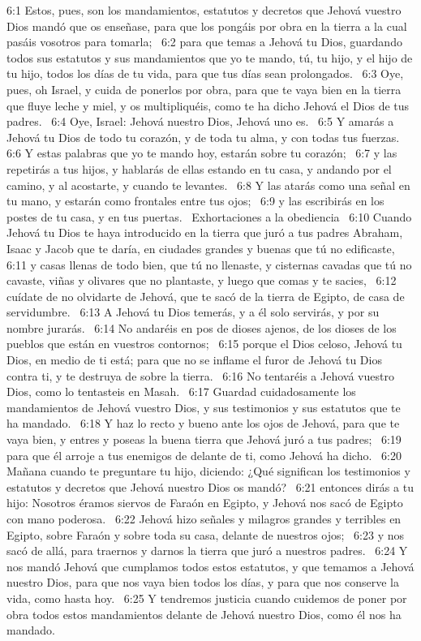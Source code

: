 6:1 Estos, pues, son los mandamientos, estatutos y decretos que Jehová vuestro Dios mandó que os enseñase, para que los pongáis por obra en la tierra a la cual pasáis vosotros para tomarla;  
6:2 para que temas a Jehová tu Dios, guardando todos sus estatutos y sus mandamientos que yo te mando, tú, tu hijo, y el hijo de tu hijo, todos los días de tu vida, para que tus días sean prolongados.  
6:3 Oye, pues, oh Israel, y cuida de ponerlos por obra, para que te vaya bien en la tierra que fluye leche y miel, y os multipliquéis, como te ha dicho Jehová el Dios de tus padres.  
6:4 Oye, Israel: Jehová nuestro Dios, Jehová uno es.  
6:5 Y amarás a Jehová tu Dios de todo tu corazón, y de toda tu alma, y con todas tus fuerzas.  
6:6 Y estas palabras que yo te mando hoy, estarán sobre tu corazón;  
6:7 y las repetirás a tus hijos, y hablarás de ellas estando en tu casa, y andando por el camino, y al acostarte, y cuando te levantes.  
6:8 Y las atarás como una señal en tu mano, y estarán como frontales entre tus ojos;  
6:9 y las escribirás en los postes de tu casa, y en tus puertas.  
Exhortaciones a la obediencia  
6:10 Cuando Jehová tu Dios te haya introducido en la tierra que juró a tus padres Abraham, Isaac y Jacob que te daría, en ciudades grandes y buenas que tú no edificaste,  
6:11 y casas llenas de todo bien, que tú no llenaste, y cisternas cavadas que tú no cavaste, viñas y olivares que no plantaste, y luego que comas y te sacies,  
6:12 cuídate de no olvidarte de Jehová, que te sacó de la tierra de Egipto, de casa de servidumbre.  
6:13 A Jehová tu Dios temerás, y a él solo servirás, y por su nombre jurarás.  
6:14 No andaréis en pos de dioses ajenos, de los dioses de los pueblos que están en vuestros contornos;  
6:15 porque el Dios celoso, Jehová tu Dios, en medio de ti está; para que no se inflame el furor de Jehová tu Dios contra ti, y te destruya de sobre la tierra.  
6:16 No tentaréis a Jehová vuestro Dios, como lo tentasteis en Masah.  
6:17 Guardad cuidadosamente los mandamientos de Jehová vuestro Dios, y sus testimonios y sus estatutos que te ha mandado.  
6:18 Y haz lo recto y bueno ante los ojos de Jehová, para que te vaya bien, y entres y poseas la buena tierra que Jehová juró a tus padres;  
6:19 para que él arroje a tus enemigos de delante de ti, como Jehová ha dicho.  
6:20 Mañana cuando te preguntare tu hijo, diciendo: ¿Qué significan los testimonios y estatutos y decretos que Jehová nuestro Dios os mandó?  
6:21 entonces dirás a tu hijo: Nosotros éramos siervos de Faraón en Egipto, y Jehová nos sacó de Egipto con mano poderosa.  
6:22 Jehová hizo señales y milagros grandes y terribles en Egipto, sobre Faraón y sobre toda su casa, delante de nuestros ojos;  
6:23 y nos sacó de allá, para traernos y darnos la tierra que juró a nuestros padres.  
6:24 Y nos mandó Jehová que cumplamos todos estos estatutos, y que temamos a Jehová nuestro Dios, para que nos vaya bien todos los días, y para que nos conserve la vida, como hasta hoy.  
6:25 Y tendremos justicia cuando cuidemos de poner por obra todos estos mandamientos delante de Jehová nuestro Dios, como él nos ha mandado.  
